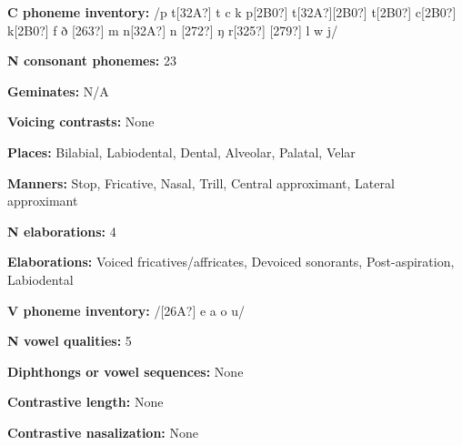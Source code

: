 \begin{styleBody}
\textbf{C phoneme inventory:} /p t[32A?] t c k p[2B0?] t[32A?][2B0?] t[2B0?] c[2B0?] k[2B0?] f ð [263?] m n[32A?] n [272?] ŋ r[325?] [279?] l w j/
\end{styleBody}

\begin{styleBody}
\textbf{N consonant phonemes:} 23
\end{styleBody}

\begin{styleBody}
\textbf{Geminates:} N/A
\end{styleBody}

\begin{styleBody}
\textbf{Voicing contrasts:} None
\end{styleBody}

\begin{styleBody}
\textbf{Places:} Bilabial, Labiodental, Dental, Alveolar, Palatal, Velar
\end{styleBody}

\begin{styleBody}
\textbf{Manners:} Stop, Fricative, Nasal, Trill, Central approximant, Lateral approximant
\end{styleBody}

\begin{styleBody}
\textbf{N elaborations:} 4
\end{styleBody}

\begin{styleBody}
\textbf{Elaborations:} Voiced fricatives/affricates, Devoiced sonorants, Post-aspiration, Labiodental
\end{styleBody}

\begin{styleBody}
\textbf{V phoneme inventory:} /[26A?] e a o u/
\end{styleBody}

\begin{styleBody}
\textbf{N vowel qualities:} 5
\end{styleBody}

\begin{styleBody}
\textbf{Diphthongs or vowel sequences:} None
\end{styleBody}

\begin{styleBody}
\textbf{Contrastive length:} None
\end{styleBody}

\begin{styleBody}
\textbf{Contrastive nasalization:} None
\end{styleBody}

